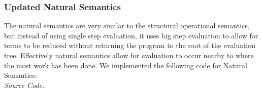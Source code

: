 \documentclass[10pt]{article}
\makeatletter
\newcommand{\Conid}[1]{\mathit{#1}}
\newcommand{\Varid}[1]{\mathit{#1}}
\newcommand{\anonymous}{\kern0.06em \vbox{\hrule\@width.5em}}
\def\resethooks{%
	\global\let\SaveRestoreHook\empty
	\global\let\ColumnHook\empty}
\newlength{\blanklineskip}
\newcommand{\hsindent}[1]{\quad}%
\makeatother
\begin{document}
\resethooks


\subsubsection*{Updated Natural Semantics}

\noindent The natural semantics are very similar to the structural operational semantics, but instead of using single step evaluation, it uses big step evaluation to allow for terms to be reduced without returning the program to the root of the evaluation tree. Effectively natural semantics allow for evaluation to occur nearby to where the most work has been done.  We implemented the following code for Natural Semantics:\\
		
\textit{Source Code:}\\
		
\end{document}
